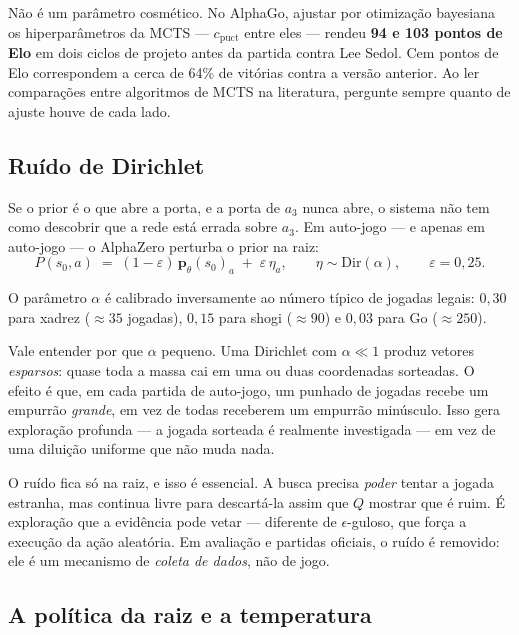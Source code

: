 \documentclass[11pt]{article}
\newcommand{\cpuct}{c_{\mathrm{puct}}}
\newcommand{\redepol}{\bm{p}_{\theta}}
\begin{document}
\begin{ideiabox}
Não é um parâmetro cosmético. No AlphaGo, ajustar por otimização bayesiana os
hiperparâmetros da MCTS — $\cpuct$ entre eles — rendeu \textbf{94 e 103 pontos de
Elo} em dois ciclos de projeto antes da partida contra Lee Sedol. Cem pontos de
Elo correspondem a cerca de 64\% de vitórias contra a versão anterior. Ao ler
comparações entre algoritmos de MCTS na literatura, pergunte sempre quanto de
ajuste houve de cada lado.
\end{ideiabox}

\subsection{Ruído de Dirichlet}
\label{sec:dir}

Se o prior é o que abre a porta, e a porta de $a_3$ nunca abre, o sistema não tem
como descobrir que a rede está errada sobre $a_3$. Em auto-jogo — e apenas em
auto-jogo — o AlphaZero perturba o prior na raiz:
\[
  P(s_0,a) \;=\; (1-\varepsilon)\,\redepol(s_0)_a \;+\; \varepsilon\,\eta_a,
  \qquad \eta \sim \mathrm{Dir}(\alpha), \qquad \varepsilon = 0{,}25 .
\]

O parâmetro $\alpha$ é calibrado inversamente ao número típico de jogadas legais:
$0{,}30$ para xadrez ($\approx 35$ jogadas), $0{,}15$ para shogi ($\approx 90$) e
$0{,}03$ para Go ($\approx 250$).

Vale entender por que $\alpha$ pequeno. Uma Dirichlet com $\alpha \ll 1$ produz
vetores \emph{esparsos}: quase toda a massa cai em uma ou duas coordenadas
sorteadas. O efeito é que, em cada partida de auto-jogo, um punhado de jogadas
recebe um empurrão \emph{grande}, em vez de todas receberem um empurrão
minúsculo. Isso gera exploração profunda — a jogada sorteada é realmente
investigada — em vez de uma diluição uniforme que não muda nada.

\begin{ideiabox}
O ruído fica só na raiz, e isso é essencial. A busca precisa \emph{poder} tentar a
jogada estranha, mas continua livre para descartá-la assim que $Q$ mostrar que é
ruim. É exploração que a evidência pode vetar — diferente de $\epsilon$-guloso,
que força a execução da ação aleatória. Em avaliação e partidas oficiais, o ruído
é removido: ele é um mecanismo de \emph{coleta de dados}, não de jogo.
\end{ideiabox}

\subsection{A política da raiz e a temperatura}
\end{document}
